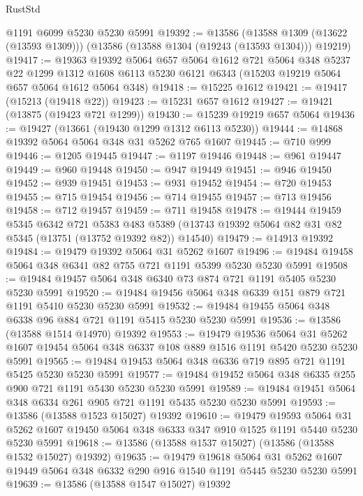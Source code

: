 \begin{lexlean}{RustStd}
\begin{coremodule}
    @1191
    @6099
    @5230
    @5230
    @5991
@19392 := @13586
    (@13588 @1309 (@13622 (@13593 @1309)))
    (@13586 (@13588 @1304 (@19243 (@13593 @1304))) @19219)
@19417 := @19363
    @19392
    @5064
    @657
    @5064
    @1612
    @721
    @5064
    @348
    @5237
    @22
    @1299
    @1312
    @1608
    @6113
    @5230
    @6121
    @6343
    (@15203 @19219 @5064 @657 @5064 @1612 @5064 @348)
@19418 := @15225 @1612
@19421 := @19417 (@15213 (@19418 @22))
@19423 := @15231 @657 @1612
@19427 := @19421 (@13875 (@19423 @721 @1299))
@19430 := @15239 @19219 @657 @5064
@19436 := @19427 (@13661 (@19430 @1299 @1312 @6113 @5230))
@19444 := @14868 @19392 @5064 @5064 @348 @31 @5262 @765 @1607
@19445 := @710 @999
@19446 := @1205 @19445
@19447 := @1197 @19446
@19448 := @961 @19447
@19449 := @960 @19448
@19450 := @947 @19449
@19451 := @946 @19450
@19452 := @939 @19451
@19453 := @931 @19452
@19454 := @720 @19453
@19455 := @715 @19454
@19456 := @714 @19455
@19457 := @713 @19456
@19458 := @712 @19457
@19459 := @711 @19458
@19478 := @19444
    @19459
    @5345
    @6342
    @721
    @5383
    @483
    @5389
    (@13743 @19392 @5064 @82 @31 @82 @5345 (@13751 (@13752 @19392 @82)) @14540)
@19479 := @14913 @19392
@19484 := @19479 @19392 @5064 @31 @5262 @1607
@19496 := @19484 @19458 @5064 @348 @6341 @82 @755 @721 @1191 @5399 @5230 @5230 @5991
@19508 := @19484 @19457 @5064 @348 @6340 @73 @874 @721 @1191 @5405 @5230 @5230 @5991
@19520 := @19484 @19456 @5064 @348 @6339 @151 @879 @721 @1191 @5410 @5230 @5230 @5991
@19532 := @19484 @19455 @5064 @348 @6338 @96 @884 @721 @1191 @5415 @5230 @5230 @5991
@19536 := @13586 (@13588 @1514 @14970) @19392
@19553 := @19479
    @19536
    @5064
    @31
    @5262
    @1607
    @19454
    @5064
    @348
    @6337
    @108
    @889
    @1516
    @1191
    @5420
    @5230
    @5230
    @5991
@19565 := @19484 @19453 @5064 @348 @6336 @719 @895 @721 @1191 @5425 @5230 @5230 @5991
@19577 := @19484 @19452 @5064 @348 @6335 @255 @900 @721 @1191 @5430 @5230 @5230 @5991
@19589 := @19484 @19451 @5064 @348 @6334 @261 @905 @721 @1191 @5435 @5230 @5230 @5991
@19593 := @13586 (@13588 @1523 @15027) @19392
@19610 := @19479
    @19593
    @5064
    @31
    @5262
    @1607
    @19450
    @5064
    @348
    @6333
    @347
    @910
    @1525
    @1191
    @5440
    @5230
    @5230
    @5991
@19618 := @13586 (@13588 @1537 @15027) (@13586 (@13588 @1532 @15027) @19392)
@19635 := @19479
    @19618
    @5064
    @31
    @5262
    @1607
    @19449
    @5064
    @348
    @6332
    @290
    @916
    @1540
    @1191
    @5445
    @5230
    @5230
    @5991
@19639 := @13586 (@13588 @1547 @15027) @19392

\end{coremodule}
\end{lexlean}
